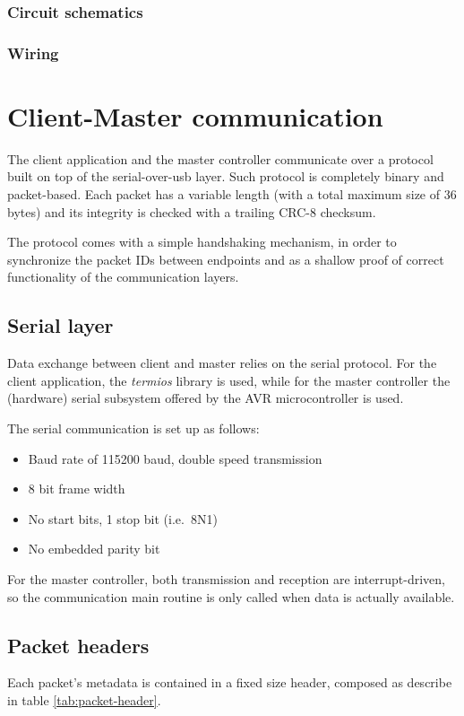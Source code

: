 \documentclass[binding=0.6cm,Lau]{sapthesis}
\begin{document}
\subsection{Circuit schematics}
\subsection{Wiring}


\chapter{Client-Master communication}
\label{ch:client-master-comm}
The client application and the master controller communicate over a protocol
built on top of the serial-over-usb layer. Such protocol is completely binary
and packet-based. Each packet has a variable length (with a total maximum size
of 36 bytes) and its integrity is checked with a trailing CRC-8 checksum.

The protocol comes with a simple handshaking mechanism, in order to synchronize
the packet IDs between endpoints and as a shallow proof of correct
functionality of the communication layers.

\section{Serial layer}
Data exchange between client and master relies on the serial protocol. For the
client application, the \emph{termios} library is used, while for the master
controller the (hardware) serial subsystem offered by the AVR
microcontroller\cite{at2560-ref} is used.

The serial communication is set up as follows:
\begin{itemize}
  \item Baud rate of 115200 baud, double speed transmission
  \item 8 bit frame width
  \item No start bits, 1 stop bit (i.e.\ 8N1)
  \item No embedded parity bit
\end{itemize}

For the master controller, both transmission and reception are
interrupt-driven, so the communication main routine is only called when data is
actually available.

\section{Packet headers}
Each packet's metadata is contained in a fixed size header, composed as
describe in table \ref{tab:packet-header}.
\end{document}
